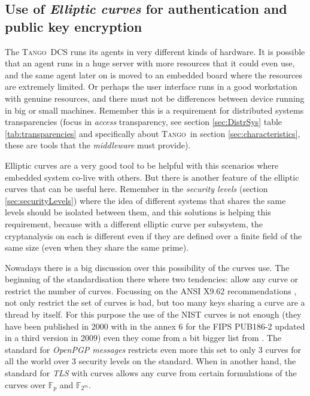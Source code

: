 \documentclass[10pt,a4paper,twoside]{llncs}
\newcommand{\tango}{\textsc{Tango}}
\begin{document}
\subsection{Use of \emph{Elliptic curves} for authentication and public key encryption}

The \tango\, DCS runs its agents in very different kinds of hardware. It is possible that an agent runs in a huge server with more resources that it could even use, and the same agent later on is moved to an embedded board where the resources are extremely limited. Or perhaps the user interface runs in a good workstation with genuine resources, and there must not be differences between device running in big or small machines. Remember this is a requirement for distributed systems transparencies (focus in \emph{access} transparency, see section \ref{sec:DistrSys} table \ref{tab:transparencies} and specifically about \tango\, in section \ref{sec:characteristics}, these are tools that the \emph{middleware} must provide).

Elliptic curves are a very good tool to be helpful with this scenarios where embedded system co-live with others. But there is another feature of the elliptic curves that can be useful here. Remember in the \emph{security levels} (section \ref{sec:securityLevels}) where the idea of different systems that shares the same levels should be isolated between them, and this solutions is helping this requirement, because with a different elliptic curve per subsystem, the cryptanalysis on each is different even if they are defined over  a finite field of the same size (even when they share the same prime).

Nowadays there is a big discussion over this possibility of the curves use. The beginning of the standardisation there where two tendencies: allow any curve or restrict the number of curves. Focussing on the ANSI X9.62 recommendations \cite{X9.62-1998}, not only restrict the set of curves is bad, but too many keys sharing a curve are a thread by itself. For this purpose the use of the NIST curves is not enough (they have been published in 2000 with in the annex 6 for the FIPS PUB186-2 updated in a third version \cite{NIST186-3} in 2009) even they come from a bit bigger list from \cite{sec2}. The standard for \emph{OpenPGP messages} \cite{rfc6637} restricts even more this set to only 3 curves for all the world over 3 security levels on the standard. When in another hand, the standard for \emph{TLS} with curves \cite{rfc4492} allows any curve from certain formulations of the curves over \ensuremath{\mathbb{F}_{p}} and \ensuremath{\mathbb{F}_{2^m}}.
\end{document}
